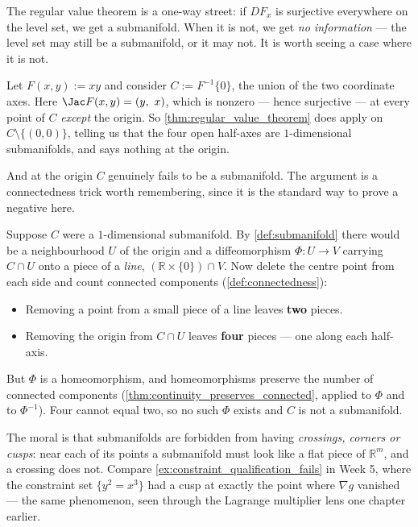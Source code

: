 \begin{aiexample}
\label{ex:cross_not_submanifold}
The regular value theorem is a one-way street: if $DF_x$ is surjective everywhere on the level
set, we get a submanifold. When it is not, we get \emph{no information} --- the level set may
still be a submanifold, or it may not. It is worth seeing a case where it is not.

Let $F(x,y) := xy$ and consider $C := F^{-1}\{0\}$, the union of the two coordinate axes.
Here $\Jac F(x,y) = (y,\ x)$, which is nonzero --- hence surjective --- at every point of $C$
\emph{except} the origin. So \cref{thm:regular_value_theorem} does apply on
$C \setminus \{(0,0)\}$, telling us that the four open half-axes are $1$-dimensional
submanifolds, and says nothing at the origin.

And at the origin $C$ genuinely fails to be a submanifold. The argument is a connectedness trick
worth remembering, since it is the standard way to prove a negative here.

Suppose $C$ were a $1$-dimensional submanifold. By \cref{def:submanifold} there would be a
neighbourhood $U$ of the origin and a diffeomorphism $\Phi : U \to V$ carrying $C \cap U$ onto a
piece of a \emph{line}, $(\mathbb{R}\times\{0\})\cap V$. Now delete the centre point from each
side and count connected components (\cref{def:connectedness}):
\begin{itemize}
  \item Removing a point from a small piece of a line leaves \textbf{two} pieces.
  \item Removing the origin from $C \cap U$ leaves \textbf{four} pieces --- one along each
    half-axis.
\end{itemize}
But $\Phi$ is a homeomorphism, and homeomorphisms preserve the number of connected components
(\cref{thm:continuity_preserves_connected}, applied to $\Phi$ and to $\Phi^{-1}$). Four cannot
equal two, so no such $\Phi$ exists and $C$ is not a submanifold.

\begin{remark}
The moral is that submanifolds are forbidden from having \emph{crossings, corners or cusps}: near
each of its points a submanifold must look like a flat piece of $\mathbb{R}^m$, and a crossing
does not. Compare \cref{ex:constraint_qualification_fails} in Week 5, where the constraint set
$\{y^2=x^3\}$ had a cusp at exactly the point where $\nabla g$ vanished --- the same phenomenon,
seen through the Lagrange multiplier lens one chapter earlier.
\end{remark}
\end{aiexample}

